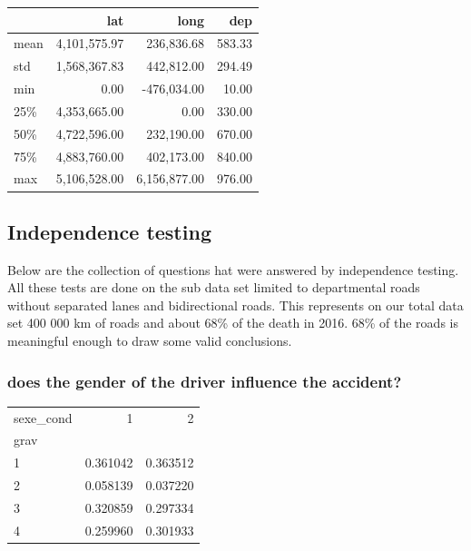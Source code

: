 \documentclass[a4paper]{article}
\theoremstyle{definition}
\theoremstyle{proposition}
\begin{document}
\begin{tabular}{lrrr}
\toprule
{} &          lat &         long &       dep \\
\midrule
mean  & 4,101,575.97 &   236,836.68 &    583.33 \\
std   & 1,568,367.83 &   442,812.00 &    294.49 \\
min   &         0.00 &  -476,034.00 &     10.00 \\
25\%   & 4,353,665.00 &         0.00 &    330.00 \\
50\%   & 4,722,596.00 &   232,190.00 &    670.00 \\
75\%   & 4,883,760.00 &   402,173.00 &    840.00 \\
max   & 5,106,528.00 & 6,156,877.00 &    976.00 \\
\bottomrule
\end{tabular}

\vspace{0.5cm}

\subsection{Independence testing}\label{Independence_testing}

Below are the collection of questions hat were answered by independence testing. All these tests are done on the sub data set limited to departmental roads without separated lanes and bidirectional roads. This represents on our total data set 400 000 km of roads and about 68\% of the death in 2016. 68\% of the roads is meaningful enough to draw some valid conclusions.


\subsubsection{does the gender of the driver influence the accident?}

\begin{tabular}{lrr}
\toprule
sexe\_cond &         1 &         2 \\
grav &           &           \\
\midrule
1    &  0.361042 &  0.363512 \\
2    &  0.058139 &  0.037220 \\
3    &  0.320859 &  0.297334 \\
4    &  0.259960 &  0.301933 \\
\bottomrule
\end{tabular}
\end{document}
